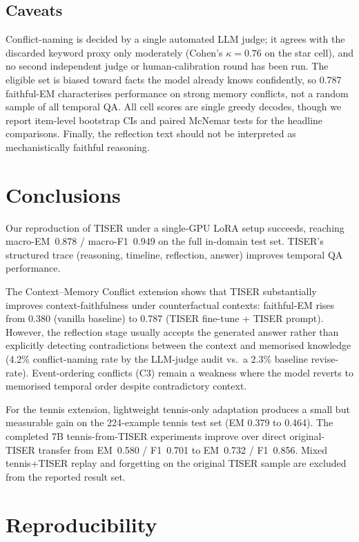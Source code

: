 \documentclass[conference]{IEEEtran}
\begin{document}
\subsection{Caveats}

Conflict-naming is decided by a single automated LLM judge; it agrees with the discarded keyword proxy only moderately (Cohen's $\kappa{=}0.76$ on the star cell), and no second independent judge or human-calibration round has been run. The eligible set is biased toward facts the model already knows confidently, so 0.787 faithful-EM characterises performance on strong memory conflicts, not a random sample of all temporal QA. All cell scores are single greedy decodes, though we report item-level bootstrap CIs and paired McNemar tests for the headline comparisons. Finally, the reflection text should not be interpreted as mechanistically faithful reasoning.

\section{Conclusions}

Our reproduction of TISER under a single-GPU LoRA setup succeeds, reaching macro-EM~0.878 / macro-F1~0.949 on the full in-domain test set. TISER's structured trace (reasoning, timeline, reflection, answer) improves temporal QA performance.

The Context--Memory Conflict extension shows that TISER substantially improves context-faithfulness under counterfactual contexts: faithful-EM rises from 0.380 (vanilla baseline) to 0.787 (TISER fine-tune + TISER prompt). However, the reflection stage usually accepts the generated answer rather than explicitly detecting contradictions between the context and memorised knowledge (4.2\% conflict-naming rate by the LLM-judge audit vs.\ a 2.3\% baseline revise-rate). Event-ordering conflicts (C3) remain a weakness where the model reverts to memorised temporal order despite contradictory context.

For the tennis extension, lightweight tennis-only adaptation produces a small but measurable gain on the 224-example tennis test set (EM 0.379 to 0.464). The completed 7B tennis-from-TISER experiments improve over direct original-TISER transfer from EM~0.580 / F1~0.701 to EM~0.732 / F1~0.856. Mixed tennis+TISER replay and forgetting on the original TISER sample are excluded from the reported result set.

\section{Reproducibility}
\end{document}
